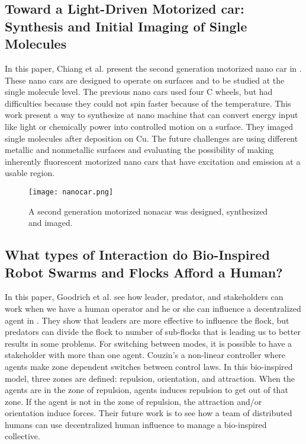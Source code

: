 \documentclass[letterpaper, 10 pt, conference]{ieeeconf}
\begin{document}
\subsection{Toward a Light-Driven Motorized 
 car: Synthesis and Initial Imaging of Single Molecules}

In this paper, Chiang et al. present the second generation motorized nano car in \cite{TourNanocar2012}. These nano cars are designed to operate on surfaces and to be studied at the single molecule level. The previous nano cars used four C wheels, but had difficulties because they could not spin faster because of the temperature. This work present a way to synthesize at nano machine that can convert energy input like light or chemically power into controlled motion on a surface. They imaged single molecules after deposition on Cu. The future challenges are using different metallic and nonmetallic surfaces and evaluating the possibility of making inherently fluorescent motorized nano cars that have excitation and emission at a usable region. 
\begin{figure}[h]
\begin{center}
\texttt{[image: nanocar.png]}
\caption{A second generation motorized nonacar was designed, synthesized and imaged\cite{TourNanocar2012}.
\label{fig:nanocar}}
\end{center}
\end{figure}
\subsection{What types of Interaction do Bio-Inspired Robot Swarms and Flocks Afford a Human?}

In this paper, Goodrich et al. see how leader, predator, and stakeholders can work when we have a human operator and he or she can influence a decentralized agent in \cite{Goodrich2012}. They show that leaders are more effective to influence the flock, but predators can divide the flock to number of sub-flocks that is leading us to better results in some problems. For switching between modes, it is possible to have a stakeholder with more than one agent. Couzin's a non-linear controller where agents make zone dependent switches between control laws. In this bio-inspired model, three zones are defined: repulsion, orientation, and attraction. When the agents are in the zone of repulsion, agents induces repulsion to get out of that zone. If the agent is not in the zone of repulsion, the attraction and/or orientation induce forces. Their future work is to see how a team of distributed humans can use decentralized human influence to manage a bio-inspired collective.
\end{document}
